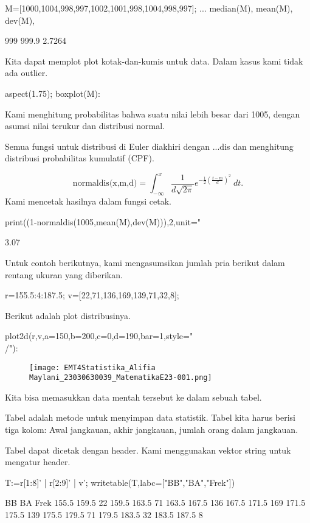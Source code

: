 \documentclass{article}
\begin{document}
\>M=[1000,1004,998,997,1002,1001,998,1004,998,997]; ...  
\>   median(M), mean(M), dev(M),


    999
    999.9
    2.7264

Kita dapat memplot plot kotak-dan-kumis untuk data. Dalam kasus kami
tidak ada outlier.


\>aspect(1.75); boxplot(M):




Kami menghitung probabilitas bahwa suatu nilai lebih besar dari 1005,
dengan asumsi nilai terukur dan distribusi normal.


Semua fungsi untuk distribusi di Euler diakhiri dengan ...dis dan
menghitung distribusi probabilitas kumulatif (CPF).


$$\text{normaldis(x,m,d)}=\int_{-\infty}^x \frac{1}{d\sqrt{2\pi}}e^{-\frac{1}{2}(\frac{t-m}{d})^2}\ dt.$$Kami mencetak hasilnya dalam %
fungsi cetak.


\>print((1-normaldis(1005,mean(M),dev(M))),2,unit=" %


          3.07 %

Untuk contoh berikutnya, kami mengasumsikan jumlah pria berikut dalam
rentang ukuran yang diberikan.


\>r=155.5:4:187.5; v=[22,71,136,169,139,71,32,8];


Berikut adalah plot distribusinya.


\>plot2d(r,v,a=150,b=200,c=0,d=190,bar=1,style="\\/"):


\begin{figure}
    \centering
    \texttt{[image: EMT4Statistika\_Alifia Maylani\_23030630039\_MatematikaE23-001.png]}
    \caption{}
    \label{fig:enter-label}
\end{figure}

Kita bisa memasukkan data mentah tersebut ke dalam sebuah tabel.


Tabel adalah metode untuk menyimpan data statistik. Tabel kita harus
berisi tiga kolom: Awal jangkauan, akhir jangkauan, jumlah orang dalam
jangkauan.


Tabel dapat dicetak dengan header. Kami menggunakan vektor string
untuk mengatur header.


\>T:=r[1:8]' | r[2:9]' | v'; writetable(T,labc=["BB","BA","Frek"])


            BB        BA      Frek
         155.5     159.5        22
         159.5     163.5        71
         163.5     167.5       136
         167.5     171.5       169
         171.5     175.5       139
         175.5     179.5        71
         179.5     183.5        32
         183.5     187.5         8
\end{document}
